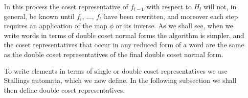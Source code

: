 \documentclass[a4paper,12pt]{article}
\numberwithin{equation}{section}
\numberwithin{figure}{section}
\begin{document}
In this process the coset representative of 
$f_{i-1}$ with respect to $H_l$ will not, in general, be known 
 until $f_i$, ..., $f_t$ have been rewritten, and moreover each step requires an application
of the map $\phi$ or its inverse. As we shall see, when we write words in terms of 
double
coset normal forms the algorithm is simpler, and the coset representatives that
occur in any reduced  form of a word are the same as 
the double coset representatives of the final double coset normal form.

To write elements in terms of single or double coset representatives we use Stallings automata, 
which we now define. In the following subsection we shall then define double coset representatives. 

\end{document}
